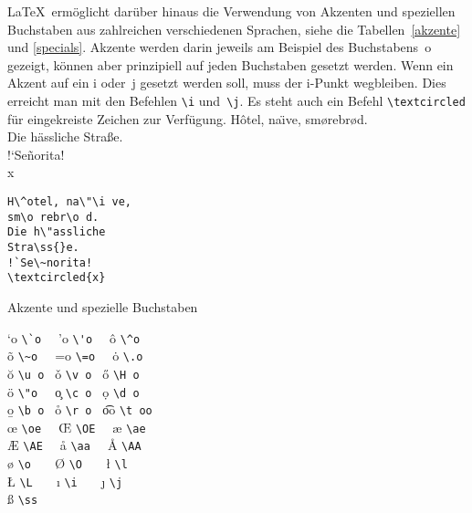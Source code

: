 \LaTeX\ ermöglicht darüber hinaus die Verwendung von Akzenten 
und speziellen Buchstaben aus zahlreichen verschiedenen Sprachen, 
siehe die Tabellen~\ref{akzente}  und \ref{specials}.
Akzente werden darin jeweils am Beispiel
des Buchstabens~o gezeigt, können aber prinzipiell auf jeden
Buchstaben gesetzt werden.
Wenn ein Akzent auf ein i oder~j gesetzt werden soll, muss der
\mbox{i-Punkt} wegbleiben. Dies erreicht man mit den Befehlen
\verb|\i| und~\verb|\j|.
Es steht auch ein Befehl \verb|\textcircled| für 
eingekreiste Zeichen zur Verfügung.
\exa
Hôtel, na\"\i ve, smørebrød.\\[1\baselineskip]
Die hässliche Straße.\\[1\baselineskip]
!`Señorita!\\
\textcircled{x}
\exb
\begin{verbatim}
H\^otel, na\"\i ve,
sm\o rebr\o d.
Die h\"assliche
Stra\ss{}e.
!`Se\~norita!
\textcircled{x}
\end{verbatim}
\exc

\begin{table}[tbp]
\caption{Akzente und spezielle Buchstaben} \label{akzente}
\begin{symbols}
\a`o  \>   \verb|\`o  | \> \a'o  \> \verb|\'o  | \> \^o   \>   \verb|\^o  | \\
\~o   \>   \verb|\~o  | \> \a=o  \> \verb|\=o  | \> \.o   \>   \verb|\.o  | \\
\u o  \>   \verb|\u o | \> \v o  \> \verb|\v o | \> \H o  \>   \verb|\H o | \\
\"o   \>   \verb|\"o  | \> \c o  \> \verb|\c o | \> \d o  \>   \verb|\d o | \\
\b o  \>   \verb|\b o | \> \r o  \> \verb|\r o | \> \t oo \>   \verb|\t oo| \\[6pt]
\oe   \>   \verb|\oe  | \> \OE   \> \verb|\OE  | \> \ae   \>   \verb|\ae  | \\
\AE   \>   \verb|\AE  | \> \aa   \> \verb|\aa  | \> \AA   \>   \verb|\AA  | \\
\o    \>   \verb|\o   | \> \O    \> \verb|\O   | \> \l    \>   \verb|\l   | \\
\L    \>   \verb|\L   | \> \i    \> \verb|\i   | \> \j    \>   \verb|\j   | \\
\ss   \>   \verb|\ss  | \\
\end{symbols}
\end{table}
 
